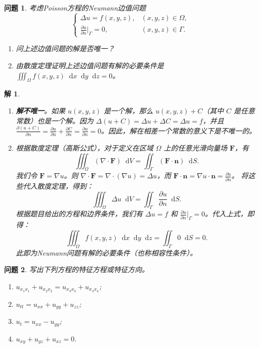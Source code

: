 \documentclass[12pt,a4paper]{article}
\newcommand{\diff}{\mathop{}\!\mathrm{d}}
\newtheorem{problem}{问题}
\newtheorem*{solution}{解}
\begin{document}
	\newpage
	
	\begin{problem}
		考虑Poisson方程的Neumann边值问题
		\[
		\begin{cases}
			\Delta u = f(x,y,z), & (x,y,z) \in \Omega, \\
			\frac{\partial u}{\partial n}\bigg|_{\Gamma} = 0, & (x,y,z) \in \Gamma.
		\end{cases}
		\]
		\begin{enumerate}[(1)]
			\item 问上述边值问题的解是否唯一？
			\item 由散度定理证明上述边值问题有解的必要条件是 \(\iiint_\Omega f(x,y,z) \diff x \diff y \diff z = 0\)。
		\end{enumerate}
	\end{problem}
	
	\begin{solution}
		\begin{enumerate}[(1)]
			\item \textbf{解不唯一}。如果 \(u(x,y,z)\) 是一个解，那么 \(u(x,y,z) + C\)（其中 \(C\) 是任意常数）也是一个解。因为 \(\Delta(u+C) = \Delta u + \Delta C = \Delta u = f\)，并且 \(\frac{\partial (u+C)}{\partial n} = \frac{\partial u}{\partial n} + \frac{\partial C}{\partial n} = \frac{\partial u}{\partial n} = 0\)。因此，解在相差一个常数的意义下是不唯一的。
			\item 根据散度定理（高斯公式），对于定义在区域 \(\Omega\) 上的任意光滑向量场 \(\mathbf{F}\)，有
			\[
			\iiint_\Omega (\nabla \cdot \mathbf{F}) \diff V = \iint_\Gamma (\mathbf{F} \cdot \mathbf{n}) \diff S.
			\]
			我们令 \(\mathbf{F} = \nabla u\)。则 \(\nabla \cdot \mathbf{F} = \nabla \cdot (\nabla u) = \Delta u\)，而 \(\mathbf{F} \cdot \mathbf{n} = \nabla u \cdot \mathbf{n} = \frac{\partial u}{\partial n}\)。
			将这些代入散度定理，得到：
			\[
			\iiint_\Omega \Delta u \diff V = \iint_\Gamma \frac{\partial u}{\partial n} \diff S.
			\]
			根据题目给出的方程和边界条件，我们有 \(\Delta u = f\) 和 \(\frac{\partial u}{\partial n}|_\Gamma = 0\)。代入上式，即得：
			\[
			\iiint_\Omega f(x,y,z) \diff x \diff y \diff z = \iint_\Gamma 0 \diff S = 0.
			\]
			此即为Neumann问题有解的必要条件（也称相容性条件）。
		\end{enumerate}
	\end{solution}
	
	\newpage
	\begin{problem}
		写出下列方程的特征方程或特征方向。
		\begin{enumerate}[(1)]
			\item \( u_{x_1x_1} + u_{x_2x_2} = u_{x_3x_3} + u_{x_4x_4} \);
			\item \( u_{tt} = u_{xx} + u_{yy} + u_{zz} \);
			\item \( u_t = u_{xx} - u_{yy} \);
			\item \( u_{xy} + u_{yz} + u_{xz} = 0 \).
		\end{enumerate}
	\end{problem}
	
\end{document}
